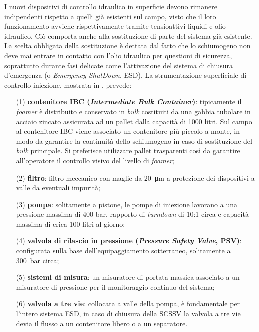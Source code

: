 I nuovi dispositivi di controllo idraulico in superficie devono rimanere indipendenti rispetto a quelli già esistenti sul campo, visto che il loro funzionamento avviene rispettivamente tramite tensioattivi liquidi e olio idraulico. Ciò comporta anche alla sostituzione di parte del sistema già esistente. La scelta obbligata della sostituzione è dettata dal fatto che lo schiumogeno non deve mai entrare in contatto con l'olio idraulico per questioni di sicurezza, soprattutto durante fasi delicate come l'attivazione del sistema di chiusura d'emergenza (o \textit{Emergency ShutDown}, ESD). La strumentazione superficiale di controllo iniezione, mostrata in , prevede:
\begin{itemize}
    \item[(1)] \textbf{contenitore IBC (\textit{Intermediate Bulk Container})}: tipicamente il \textit{foamer} è distribuito e conservato in \textit{bulk} costituiti da una gabbia tubolare in acciaio zincato assicurata ad un pallet dalla capacità di 1000 litri. Sul campo al contenitore IBC viene associato un contenitore più piccolo a monte, in modo da garantire la continuità dello schiumogeno in caso di sostituzione del \textit{bulk} principale. Si preferisce utilizzare pallet trasparenti così da garantire all'operatore il controllo visivo del livello di \textit{foamer};
    \item[(2)] \textbf{filtro}: filtro meccanico con maglie da \SI{20}{\um} a protezione dei dispositivi a valle da eventuali impurità;
    \item[(3)] \textbf{pompa}: solitamente a pistone, le pompe di iniezione lavorano a una pressione massima di 400 bar, rapporto di \textit{turndown} di 10:1 circa e capacità massima di crica 100 litri al giorno;
    \item[(4)] \textbf{valvola di rilascio in pressione (\textit{Pressure Safety Valve}, PSV)}: configurata sulla base dell'equipaggiamento sotterraneo, solitamente a \SI{300}{bar} circa;
    \item[(5)] \textbf{sistemi di misura}: un misuratore di portata massica associato a un misuratore di pressione per il monitoraggio continuo del sistema;
    \item[(6)] \textbf{valvola a tre vie}: collocata a valle della pompa, è fondamentale per l'intero sistema ESD, in caso di chiusura della SCSSV la valvola a tre vie devia il flusso a un contenitore libero o a un separatore.
\end{itemize}

